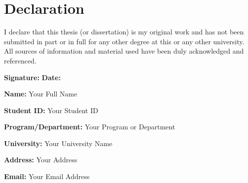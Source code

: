 
\chapter*{Declaration}

I declare that this thesis (or dissertation) is my original work and has not been submitted in part or in full for any other degree at this or any other university. All sources of information and material used have been duly acknowledged and referenced.

\vspace{1cm}

\noindent\begin{minipage}{\textwidth}

\textbf{Signature:} \hspace{7cm} \textbf{Date:}

\vspace{2cm}

\textbf{Name:} Your Full Name

\textbf{Student ID:} Your Student ID

\textbf{Program/Department:} Your Program or Department

\textbf{University:} Your University Name

\textbf{Address:} Your Address

\textbf{Email:} Your Email Address

\end{minipage}

